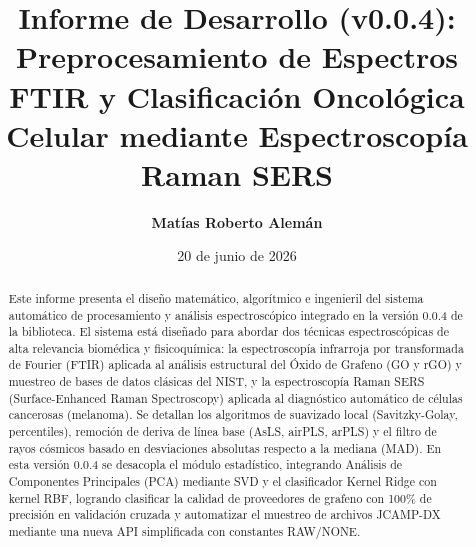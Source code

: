 \documentclass[a4paper,11pt]{article}
\title{\textbf{Informe de Desarrollo (v0.0.4): \\Preprocesamiento de Espectros FTIR y Clasificación Oncológica Celular mediante Espectroscopía Raman SERS}}
\author{\textbf{Matías Roberto Alemán}}
\date{20 de junio de 2026}
\begin{document}
\maketitle

\begin{abstract}
Este informe presenta el diseño matemático, algorítmico e ingenieril del sistema automático de procesamiento y análisis espectroscópico integrado en la versión 0.0.4 de la biblioteca. El sistema está diseñado para abordar dos técnicas espectroscópicas de alta relevancia biomédica y fisicoquímica: la espectroscopía infrarroja por transformada de Fourier (FTIR) aplicada al análisis estructural del Óxido de Grafeno (GO y rGO) y muestreo de bases de datos clásicas del NIST, y la espectroscopía Raman SERS (Surface-Enhanced Raman Spectroscopy) aplicada al diagnóstico automático de células cancerosas (melanoma). Se detallan los algoritmos de suavizado local (Savitzky-Golay, percentiles), remoción de deriva de línea base (AsLS, airPLS, arPLS) y el filtro de rayos cósmicos basado en desviaciones absolutas respecto a la mediana (MAD). En esta versión 0.0.4 se desacopla el módulo estadístico, integrando Análisis de Componentes Principales (PCA) mediante SVD y el clasificador Kernel Ridge con kernel RBF, logrando clasificar la calidad de proveedores de grafeno con 100\% de precisión en validación cruzada y automatizar el muestreo de archivos JCAMP-DX mediante una nueva API simplificada con constantes RAW/NONE.
\end{abstract}

\vspace{0.2cm}
\noindent\hrulefill
\vspace{0.2cm}
\end{document}
